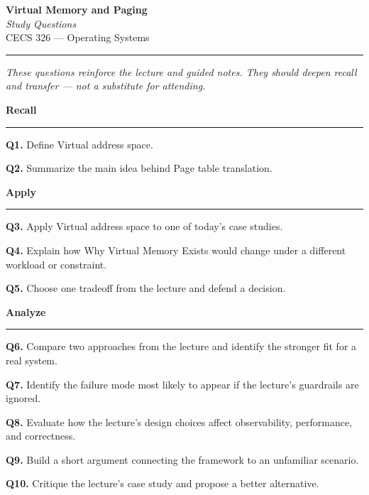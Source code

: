 \documentclass[12pt]{article}
\begin{document}
\thispagestyle{fancy}

{\color{instrNavy}\LARGE\textbf{Virtual Memory and Paging}}\\[0.3em]
{\large\textit{Study Questions}}\\[0.1em]
{\normalsize CECS 326 — Operating Systems}\\[0.5em]
{\color{instrNavy}\rule{\linewidth}{1.5pt}}
\vspace{0.5em}

\noindent\textit{These questions reinforce the lecture and guided notes. They should deepen recall and transfer — not a substitute for attending.}


{\color{instrNavy}\large\textbf{Recall}}
{\color{instrNavy}\rule{\linewidth}{0.4pt}}

\noindent\textbf{Q1.} Define Virtual address space.

\vspace{2em}

\noindent\textbf{Q2.} Summarize the main idea behind Page table translation.

\vspace{2em}


{\color{instrNavy}\large\textbf{Apply}}
{\color{instrNavy}\rule{\linewidth}{0.4pt}}

\noindent\textbf{Q3.} Apply Virtual address space to one of today’s case studies.

\vspace{3em}

\noindent\textbf{Q4.} Explain how Why Virtual Memory Exists would change under a different workload or constraint.

\vspace{3em}

\noindent\textbf{Q5.} Choose one tradeoff from the lecture and defend a decision.

\vspace{3em}


{\color{instrNavy}\large\textbf{Analyze}}
{\color{instrNavy}\rule{\linewidth}{0.4pt}}

\noindent\textbf{Q6.} Compare two approaches from the lecture and identify the stronger fit for a real system.

\vspace{4em}

\noindent\textbf{Q7.} Identify the failure mode most likely to appear if the lecture’s guardrails are ignored.

\vspace{4em}

\noindent\textbf{Q8.} Evaluate how the lecture’s design choices affect observability, performance, and correctness.

\vspace{4em}

\noindent\textbf{Q9.} Build a short argument connecting the framework to an unfamiliar scenario.

\vspace{4em}

\noindent\textbf{Q10.} Critique the lecture’s case study and propose a better alternative.

\vspace{4em}
\end{document}
